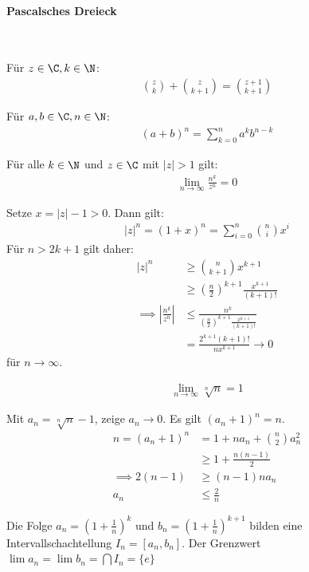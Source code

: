 \paragraph{Pascalsches Dreieck} \ 
\begin{theorem}
	Für $z\in \C, k\in \N$:
	\begin{align*}
		\binom{z}{k}+\binom{z}{k+1}=\binom{z+1}{k+1}
	\end{align*}
\end{theorem}
\begin{theorem}
	Für $a,b\in \C, n\in \N$:
	\begin{align*}
		(a+b)^n=\sum\limits_{k=0}^na^kb^{n-k}
	\end{align*}
\end{theorem}
\begin{theorem}
	Für alle $k\in \N$ und $z\in \C$ mit $|z|>1$ gilt:
	\begin{align*}
		\lim\limits_{n\to \infty} \frac{n^k}{z^n} = 0
	\end{align*}
\end{theorem}
\prove Setze $x=|z|-1>0$. Dann gilt:\begin{align*}
	|z|^n=(1+x)^n=\sum\limits_{i=0}^n\binom{n}{i}x^i
\end{align*}
Für $n>2k+1$ gilt daher:
\begin{align*}
	|z|^n&\geq \binom{n}{k+1}x^{k+1}\\
	&\geq \left(\frac{n}{2}\right)^{k+1}\frac{x^{k+1}}{(k+1)!}\\
	\implies \left|\frac{n^k}{z^n}\right|&\leq \frac{n^k}{\left(\frac{n}{2}\right)^{k+1}\frac{x^{k+1}}{(k+1)!}}\\
	&=\frac{2^{k+1}(k+1)!}{nx^{k+1}}\to 0
\end{align*}
für $n\to \infty$.
\begin{theorem}
	\begin{align*}
		\lim\limits_{n\to \infty}\sqrt[n]{n}=1
	\end{align*}
\end{theorem}
\prove Mit $a_n=\sqrt[n]{n}-1$, zeige $a_n\to 0$. Es gilt $(a_n+1)^n=n$.
\begin{align*}
	n=(a_n+1)^n&=1+na_n+\binom{n}{2}a_n^2\\
	&\geq 1+\frac{n(n-1)}{2}\\
	\implies 
	2(n-1)&\geq (n-1)na_n\\
	a_n &\leq \frac{2}{n}
\end{align*}
\begin{theorem}
	Die Folge $a_n=\left(1+\frac{1}{n}\right)^k$ und $b_n=\left(1+\frac{1}{n}\right)^{k+1}$ bilden eine Intervallschachtellung $I_n=[a_n,b_n]$. Der Grenzwert $\lim a_n=\lim b_n=\bigcap I_n=\{e\}$ 
\end{theorem}
